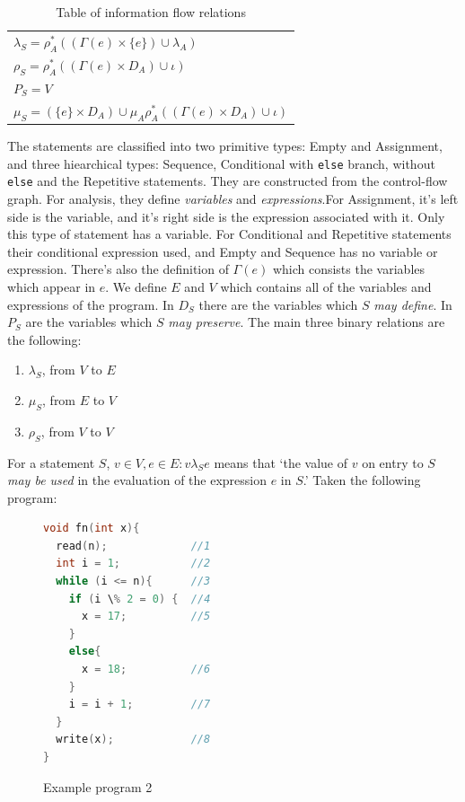 \documentclass[oneside,12pt,a4paper]{book}
\begin{document}
\begin{table}[t]
\begin{tabular}{l}
$\lambda_S = \rho^*_A((\Gamma(e) \times \{e\}) \cup \lambda_A)$                   \\
$\rho_S = \rho^*_A((\Gamma(e) \times D_A) \cup \iota)$                            \\
$P_S = V$                                                                                   \\
$\mu_S = (\{e\} \times D_A) \cup \mu_A\rho^*_A((\Gamma(e) \times D_A) \cup \iota)$\\
  \end{tabular}
  \caption{Table of information flow relations}
  \label{tab:informationFlowTable}
\end{table}
\FloatBarrier
The statements are classified into two primitive types: Empty and Assignment, and three hiearchical types: Sequence, Conditional with \texttt{else} branch, without \texttt{else} and the Repetitive statements. They are constructed from the control-flow graph. For analysis, they define \textit{variables} and \textit{expressions}.For Assignment, it's left side is the variable, and it's right side is the expression associated with it. Only this type of statement has a variable. For Conditional and Repetitive statements their conditional expression used, and Empty and Sequence has no variable or expression. There's also the definition of $\Gamma(e)$ which consists the variables which appear in $e$. We define $E$ and $V$ which contains all of the variables and expressions of the program. In $D_S$ there are the variables which $S$ \textit{may define}. In $P_S$ are the variables which $S$ \textit{may preserve}. The main three binary relations are the following:
\begin{enumerate}
\item $\lambda_S$, from $V$ to $E$
\item $\mu_S$, from $E$ to $V$
\item $\rho_S$, from $V$ to $V$
\end{enumerate}

For a statement $S$, $v \in V, e \in E: v \lambda_S e$ means that `the value of $v$ on entry to $S$ \textit{may be used} in the evaluation of the expression $e$ in $S$.' Taken the following program:
\begin{figure}[h]
\begin{lstlisting}[language=C++]
void fn(int x){
  read(n);             //1
  int i = 1;           //2
  while (i <= n){      //3
    if (i \% 2 = 0) {  //4
      x = 17;          //5
    }
    else{              
      x = 18;          //6
    }
    i = i + 1;         //7
  }
  write(x);            //8
}
\end{lstlisting}
\caption{Example program 2}
\label{fig:example_prog_2}
\end{figure}
\end{document}
